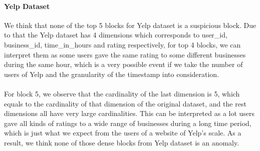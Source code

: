 \paragraph{Yelp Dataset} We think that none of the top 5 blocks for Yelp dataset is a suspicious block. Due to that the Yelp dataset has 4 dimensions which corresponds to user\_id, business\_id, time\_in\_hours and rating respectively,
for top 4 blocks, we can interpret them as some users gave the same rating to some different businesses during the same hour, which is a very possible event if we take the number of users of Yelp and the granularity of the timestamp
into consideration.
\paragraph{} For block 5, we observe that the cardinality of the last dimension is 5, which equals to the cardinality of that dimension of the original dataset, and the rest dimensions all have very large cardinalities. This can be
interpreted as a lot users gave all kinds of ratings to a wide range of businesses during a long time period, which is just what we expect from the users of a website of Yelp's scale. As a result, we think none of those dense blocks from Yelp dataset is an anomaly.

